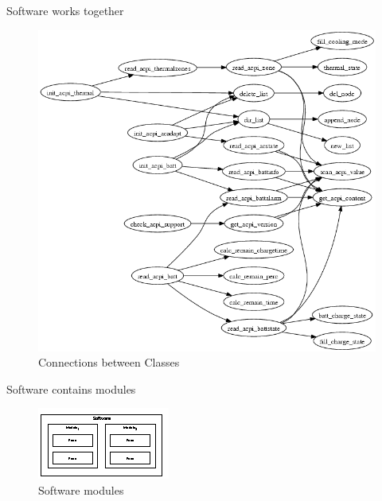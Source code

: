 \documentclass{beamer}
\begin{document}
\begin{frame}{Software works together}
    \begin{figure}
        \includegraphics[height=.7\paperheight]{figure/graph.png}
        \caption{Connections between Classes}
        \label{fig:classConnection}
    \end{figure}
\end{frame}

\begin{frame}{Software contains modules}
    \begin{figure}
        \includegraphics[width=.7\paperwidth]{figure/software-modules}
        \caption{Software modules}
        \label{fig:softwareModules}
    \end{figure}
\end{frame}

\end{document}
